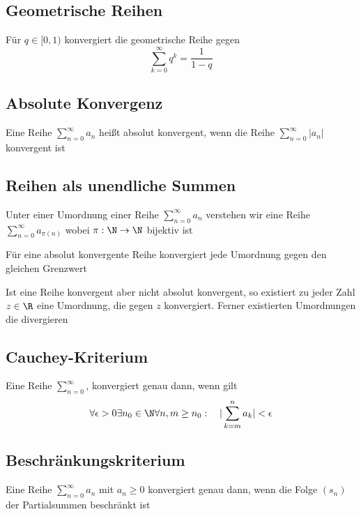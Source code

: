 	\subsection{Geometrische Reihen}
		\begin{Satz} [ ]
			Für $q\in[0, 1)$ konvergiert die geometrische Reihe gegen
			$$
				\displaystyle\sum_{k=0}^\infty q^k=\frac{1}{1-q}
			$$
		\end{Satz}
	\subsection{Absolute Konvergenz}
		\begin{Definition} 
			Eine Reihe $\displaystyle\sum_{n=0}^\infty a_n$ heißt absolut konvergent, wenn die Reihe $\displaystyle\sum_{n=0}^\infty|a_n|$ konvergent ist
		\end{Definition}
	\subsection{Reihen als unendliche Summen}
		\begin{Definition} [ Umordnung]
			Unter einer Umordnung einer Reihe $\displaystyle\sum_{n=0}^\infty a_n$ verstehen wir eine Reihe $\displaystyle\sum_{n=0}^\infty a_{\pi(n)}$ wobei $\pi: \N \to \N$ bijektiv ist
		\end{Definition}
		\begin{Satz} [ Umordnungssatz]
			Für eine absolut konvergente Reihe konvergiert jede Umordnung gegen den gleichen Grenzwert
		\end{Satz}
		\begin{Satz} [ ]
			Ist eine Reihe konvergent aber nicht absolut konvergent, so existiert zu jeder Zahl $z\in\R$ eine Umordnung, die gegen $z$ konvergiert. Ferner existierten Umordnungen die divergieren
		\end{Satz}
	\subsection{Cauchey-Kriterium}
		\begin{Satz} 
				Eine Reihe $\displaystyle\sum_{n=0}^\infty$, konvergiert genau dann, wenn gilt
				$$
					\forall\epsilon > 0\exists n_0\in \N\forall n, m\geq n_0:\quad |\displaystyle\sum_{k=m}^na_k|<\epsilon
				$$
		\end{Satz}
	\subsection{Beschränkungskriterium}
		\begin{Satz} [ ]
			Eine Reihe $\displaystyle\sum_{n=0}^\infty a_n$ mit $a_n\geq 0$ konvergiert genau dann, wenn die Folge $(s_n)$ der Partialsummen beschränkt ist
		\end{Satz}
